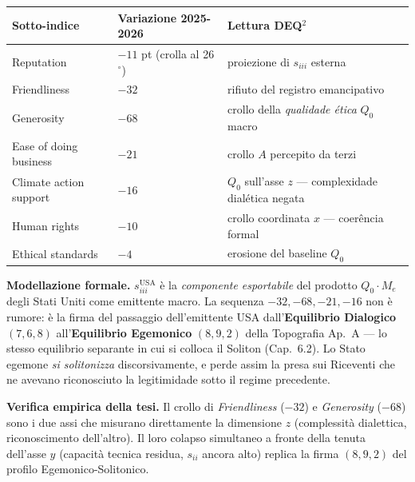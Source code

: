 {\def\LTcaptype{none} %
{\small\begin{longtable}[]{@{}
  >{\raggedright\arraybackslash}p{}
  >{\raggedright\arraybackslash}p{}
  >{\raggedright\arraybackslash}p{}@{}}
\toprule\noalign{}
\begin{minipage}[b]{\linewidth}\raggedright
Sotto-indice
\end{minipage} & \begin{minipage}[b]{\linewidth}\raggedright
Variazione 2025-2026
\end{minipage} & \begin{minipage}[b]{\linewidth}\raggedright
Lettura DEQ$^2$
\end{minipage} \\
\midrule\noalign{}
\endhead
\bottomrule\noalign{}
\endlastfoot
Reputation & \(-11\) pt (crolla al 26$^\circ$) & proiezione di \(s_{iii}\)
esterna \\
Friendliness & \(-32\) & rifiuto del registro emancipativo \\
Generosity & \(-68\) & crollo della \emph{qualidade ética} \(Q_0\)
macro \\
Ease of doing business & \(-21\) & crollo \(A\) percepito da terzi \\
Climate action support & \(-16\) & \(Q_0\) sull'asse \(z\) ---
complexidade dialética negata \\
Human rights & \(-10\) & crollo coordinata \(x\) --- coerência formal \\
Ethical standards & \(-4\) & erosione del baseline \(Q_0\) \\
\end{longtable}}
}

\Hypoth{} \textbf{Modellazione formale.} \(s_{iii}^{\text{USA}}\) è la
\emph{componente esportabile} del prodotto \(Q_0 \cdot M_e\) degli Stati
Uniti come emittente macro. La sequenza \(-32, -68, -21, -16\) non è
rumore: è la firma del passaggio dell'emittente USA
dall'\textbf{Equilibrio Dialogico} \((7, 6, 8)\) all'\textbf{Equilibrio
Egemonico} \((8, 9, 2)\) della Topografia Ap.~A --- lo stesso
equilibrio separante in cui si colloca il Soliton (Cap.~6.2). Lo Stato
egemone \emph{si solitonizza} discorsivamente, e perde assim la presa sui
Riceventi che ne avevano riconosciuto la legitimidade sotto il regime
precedente.

\Proved{} \textbf{Verifica empirica della tesi.} Il crollo di
\emph{Friendliness} (\(-32\)) e \emph{Generosity} (\(-68\)) sono i due
assi che misurano direttamente la dimensione \(z\) (complessità
dialettica, riconoscimento dell'altro). Il loro colapso simultaneo a
fronte della tenuta dell'asse \(y\) (capacità tecnica residua,
\(s_{ii}\) ancora alto) replica la firma \((8, 9, 2)\) del profilo
Egemonico-Solitonico.



